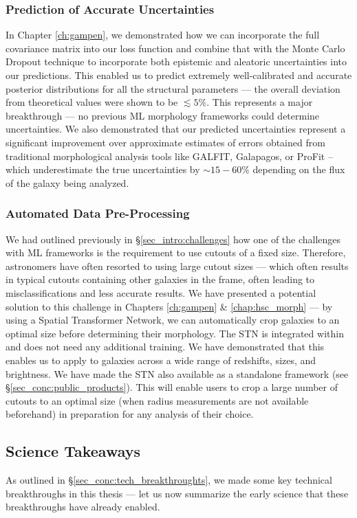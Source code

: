 \subsubsection{Prediction of Accurate Uncertainties}
In Chapter \ref{ch:gampen}, we demonstrated how we can incorporate the full covariance matrix into our loss function and combine that with the Monte Carlo Dropout technique to incorporate both epistemic and aleatoric uncertainties into our predictions. This enabled us to predict extremely well-calibrated and accurate posterior distributions for all the structural parameters --- the overall deviation from theoretical values were shown to be $\lesssim 5\%$. This represents a major breakthrough --- no previous ML morphology frameworks could determine uncertainties. We also demonstrated that our predicted uncertainties represent a significant improvement over approximate estimates of errors obtained from traditional morphological analysis tools like GALFIT, Galapagos, or ProFit -- which underestimate the true uncertainties by $\sim15-60\%$ depending on the flux of the galaxy being analyzed. 


\subsubsection{Automated Data Pre-Processing} 
We had outlined previously in \S \ref{sec_intro:challenges} how one of the challenges with ML frameworks is the requirement to use cutouts of a fixed size. Therefore, astronomers have often resorted to using large cutout sizes --- which often results in typical cutouts containing other galaxies in the frame, often leading to misclassifications and less accurate results. We have presented a potential solution to this challenge in Chapters \ref{ch:gampen} \& \ref{chap:hsc_morph} --- by using a Spatial Transformer Network, we can automatically crop galaxies to an optimal size before determining their morphology. The STN is integrated within \gampen{} and does not need any additional training. We have demonstrated that this enables us to apply \gampen{} to galaxies across a wide range of redshifts, sizes, and brightness. We have made the STN also available as a standalone framework (see \S \ref{sec_conc:public_products}). This will enable users to crop a large number of cutouts to an optimal size (when radius measurements are not available beforehand) in preparation for any analysis of their choice.  

\subsection{Science Takeaways} \label{sec_conc:science_takeaways}
As outlined in \S \ref{sec_conc:tech_breakthroughts}, we made some key technical breakthroughs in this thesis --- let us now summarize the early science that these breakthroughs have already enabled. 

